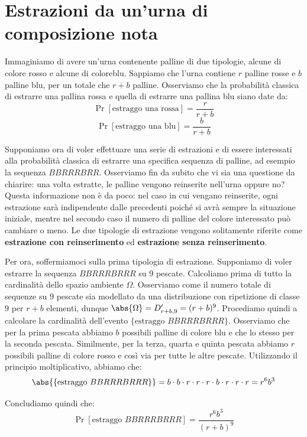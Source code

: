 \documentclass[a4paper, 12pt]{report}
\begin{document}
    \section{Estrazioni da un'urna di composizione nota}

    Immaginiamo di avere un'urna contenente palline di due tipologie, alcune di colore rosso e alcune di coloreblu. Sappiamo che l'urna contiene $r$ palline rosse e $b$ palline blu, per un totale che $r+b$ palline. Osserviamo che la probabilità classica di estrarre una pallina rossa e quella di estrarre una pallina blu siano date da:
    \[\Pr[\text{estraggo una rossa}] = \frac{r}{r+b}\]
    \[\Pr[\text{estraggo una blu}] = \frac{b}{r+b}\]

    Supponiamo ora di voler effettuare una serie di estrazioni e di essere interessati alla probabilità classica di estrarre una specifica sequenza di palline, ad esempio la sequenza $BBRRRBRR$. Osserviamo fin da subito che vi sia una questione da chiarire: una volta estratte, le palline vengono reinserite nell'urna oppure no? Questa informazione non è da poco: nel caso in cui vengano reinserite, ogni estrazione sarà indipendente dalle precedenti poiché si avrà sempre la situazione iniziale, mentre nel secondo caso il numero di palline del colore interessato può cambiare o meno. Le due tipologie di estrazione vengono solitamente riferite come \textbf{estrazione con reinserimento} ed \textbf{estrazione senza reinserimento}.

    Per ora, soffermiamoci sulla prima tipologia di estrazione. Supponiamo di voler estrarre la sequenza $BBRRRBRRR$ su $9$ pescate. Calcoliamo prima di tutto la cardinalità dello spazio ambiente $\Omega$. Osserviamo come il numero totale di sequenze su $9$ pescate sia modellato da una distribuzione con ripetizione di classe $9$ per $r+b$ elementi, dunque $\abs{\Omega} = D'_{r+b,9} = (r+b)^9$. Procediamo quindi a calcolare la cardinalità dell'evento $\{\text{estraggo } BBRRRBRRR\}$. Osserviamo che per la prima pescata abbiamo $b$ possibili palline di colore blu e che lo stesso per la seconda pescata. Similmente, per la terza, quarta e quinta pescata abbiamo $r$ possibili palline di colore rosso e così via per tutte le altre pescate. Utilizzando il principio moltiplicativo, abbiamo che:
    \[\abs{\{\text{estraggo } BBRRRBRRR\}} = b \cdot b \cdot r \cdot r \cdot r \cdot b \cdot r \cdot r \cdot r = r^6 b^3 \]
    
    Concludiamo quindi che:
    \[\Pr[\text{estraggo } BBRRRBRRR] = \frac{r^6b^3}{(r+b)^9}\]
\end{document}
